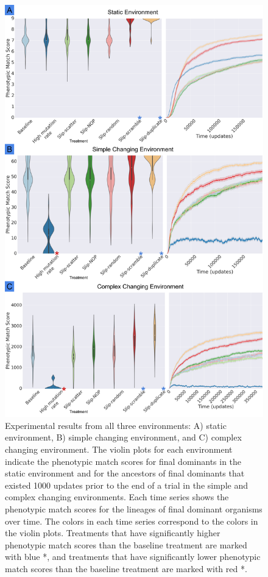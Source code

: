 \begin{figure}[!h]
  \includegraphics[width=\columnwidth]{imgs/results_panels.png}
  \caption{\small Experimental results from all three environments: A) static environment, B) simple changing environment, and C) complex changing environment. The violin plots for each environment indicate the phenotypic match scores for final dominants in the static environment and for the ancestors of final dominants that existed 1000 updates prior to the end of a trial in the simple and complex changing environments. Each time series shows the phenotypic match scores for the lineages of final dominant organisms over time. The colors in each time series correspond to the colors in the violin plots. Treatments that have significantly higher phenotypic match scores than the baseline treatment are marked with blue *, and treatments that have significantly lower phenotypic match scores than the baseline treatment are marked with red *.  }
  \label{fig:results_panels}
\end{figure}